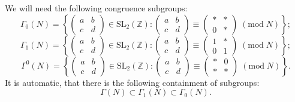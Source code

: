 \documentclass[11pt,a4paper]{amsart}
\theoremstyle{definition}
\newcommand{\SZ}{\mathbb{Z}}                    %
\begin{document}
We will need the following congruence subgroups:
\[  \Gamma_0(N) = \left\{ \begin{pmatrix} a & b \\ c & d \end{pmatrix} \in \mathrm{SL_2}(\SZ) : \begin{pmatrix} a & b \\ c & d \end{pmatrix} \equiv \begin{pmatrix} \ast & \ast \\ 0 & \ast \end{pmatrix} \;(\mathrm{mod}\;N) \right\}; \]
\[  \Gamma_1(N) = \left\{ \begin{pmatrix} a & b \\ c & d \end{pmatrix} \in \mathrm{SL_2}(\SZ) : \begin{pmatrix} a & b \\ c & d \end{pmatrix} \equiv \begin{pmatrix} 1 & \ast \\ 0 & 1 \end{pmatrix} \;(\mathrm{mod}\;N) \right\}; \]
\[  \Gamma^0(N) = \left\{ \begin{pmatrix} a & b \\ c & d \end{pmatrix} \in \mathrm{SL_2}(\SZ) : \begin{pmatrix} a & b \\ c & d \end{pmatrix} \equiv \begin{pmatrix} \ast & 0 \\ \ast & \ast \end{pmatrix} \;(\mathrm{mod}\;N) \right\}. \]
It is automatic, that there is the following containment of subgroups:
\[ \Gamma(N) \subset \Gamma_1(N) \subset \Gamma_0(N). \]
\end{document}
